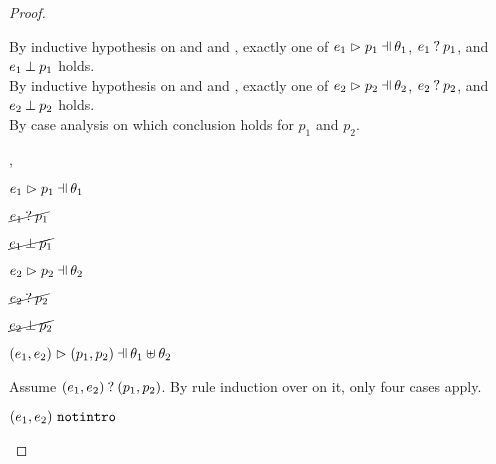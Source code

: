 \begin{proof}
\begin{byCases}
\begin{byCases}
\begin{pfsteps*}
        \end{pfsteps*}
        By inductive hypothesis on  and  and , exactly one of $\hpatmatch{e_1}{p_1}{\theta_1}$, $e_1 \mathbin{?} p_1$, and $e_1 \mathbin{\bot} p_1$ holds. \\
        By inductive hypothesis on  and  and , exactly one of $\hpatmatch{e_2}{p_2}{\theta_2}$, $e_2 \mathbin{?} p_2$, and $e_2 \mathbin{\bot} p_2$ holds. \\
        By case analysis on which conclusion holds for $p_1$ and $p_2$.
        \begin{byCases}
        \item[\hpatmatch{e_1}{p_1}{\theta_1},\hpatmatch{e_2}{p_2}{\theta_2}]
            \begin{pfsteps*}
            \item $\hpatmatch{e_1}{p_1}{\theta_1}$  
            \item $\cancel{e_1 \mathbin{?} p_1}$  
            \item $\cancel{e_1 \mathbin{\bot} p_1}$  
            \item $\hpatmatch{e_2}{p_2}{\theta_2}$  
            \item $\cancel{e_2 \mathbin{?} p_2}$  
            \item $\cancel{e_2 \mathbin{\bot} p_2}$  
            \item $\hpatmatch{\hpair{e_1}{e_2}}{\hpair{p_1}{p_2}}{\theta_1 \uplus \theta_2}$ 
            \end{pfsteps*}
            Assume $(e_1 , e_2) \mathbin{?} (p_1 , p_2)$. By rule induction over  on it, only four cases apply.
            \begin{byCases}
            \item[\text{(\ref{rule:MMNotIntro})}]
                \begin{pfsteps*}
                \item $(e_1 , e_2) ~\mathtt{notintro}$ 
                \end{pfsteps*}

\end{byCases}
\end{byCases}
\end{byCases}
\end{byCases}
\end{proof}
